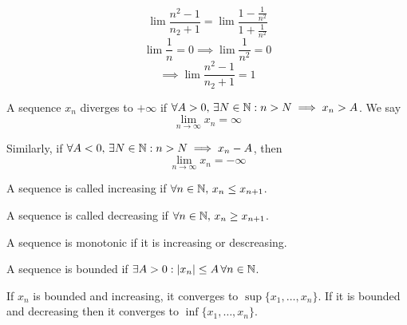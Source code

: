 \documentclass[a4paper,10pt]{article}
\begin{document}
\begin{ex}
	\[
		\lim \frac{n^2 - 1}{n_2 + 1}
		= \lim \frac{1 - \frac{1}{n^2}}{1 + \frac{1}{n^2}}
	\]
	\[ \lim \frac{1}{n} = 0 \implies \lim \frac{1}{n^2} = 0 \]
	\[ \implies \lim \frac{n^2 - 1}{n_2 + 1} = 1 \]
\end{ex}

\begin{defn}[Divergence]
	A sequence $x_n$ diverges to $+\infty$ if $\forall A > 0, \,
	\exists N \in \mathbb{N} : n > N \implies x_n > A$. We say
	\[ \lim_{n \to \infty} x_n = \infty \]

	Similarly, if $\forall A < 0, \, \exists N \in \mathbb{N} : n > N
	\implies x_n - A$, then
	\[ \lim_{n \to \infty} x_n = -\infty \]
\end{defn}

\begin{defn}[Increasing]
	A sequence is called increasing if $\forall n \in \mathbb{N}, \, x_n
	\leq x_{n+1}$.
\end{defn}

\begin{defn}[Decreasing]
	A sequence is called decreasing if $\forall n \in \mathbb{N}, \, x_n
	\geq x_{n+1}$.
\end{defn}

\begin{defn}[Monotonic]
	A sequence is monotonic if it is increasing or descreasing.
\end{defn}

\begin{defn}[Bounded]
	A sequence is bounded if $\exists A > 0 : |x_n| \leq A \,
	\forall n \in \mathbb{N}$.
\end{defn}

\begin{thm}[MonontonicConvergence]
	If $x_n$ is bounded and increasing, it converges to $\sup\{x_1,
	\ldots, x_n\}$. If it is bounded and decreasing then it
	converges to $\inf\{x_1, \ldots, x_n\}$.
\end{thm}
\end{document}
